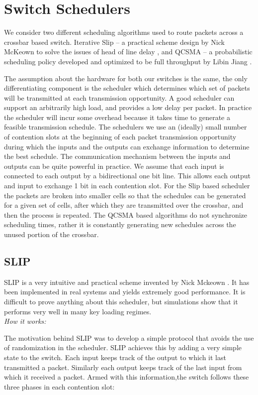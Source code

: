 \documentclass{IEEEtran}%
\begin{document}
\section{Switch Schedulers}
We consider two different scheduling algorithms used to route packets across a crossbar based switch.  Iterative Slip -- a practical scheme design by Nick McKeown to solve the issues of head of line delay \cite{McKeown}, and QCSMA -- a probabilistic scheduling policy developed and optimized to be full throughput by Libin Jiang \cite{Libin}.

The assumption about the hardware for both our switches is the same, the only differentiating component is the scheduler which determines which set of packets will be transmitted at each transmission opportunity.  A good scheduler can support an arbitrarily high load, and provides a low delay per packet.  In practice the scheduler will incur some overhead because it takes time to generate a feasible transmission schedule.  The schedulers we use an (ideally) small number of contention slots at the beginning of each packet transmission opportunity during which the inputs and the outputs can exchange information to determine the best schedule.  The communication mechanism between the inputs and outputs can be quite powerful in practice.  We assume that each input is connected to each output by a bidirectional one bit line. This allows each output and input to exchange 1 bit in each contention slot.  For the Slip based scheduler the packets are broken into smaller cells so that the schedules can be generated for a given set of cells, after which they are transmitted over the crossbar, and then the process is repeated.  The QCSMA based algorithms do not synchronize scheduling times, rather it is constantly generating new schedules across the unused portion of the crossbar.

\subsection{SLIP}

SLIP is a very intuitive and practical scheme invented by Nick Mckeown \cite{McKeown}.  It has been implemented in real systems and yields extremely good performance.  It is difficult to prove anything about this scheduler, but simulations show that it performs very well in many key loading regimes.\\

{\it How it works:}

The motivation behind SLIP was to develop a simple protocol that avoids the use of randomization in the scheduler.  SLIP achieves this by adding a very simple state to the switch.  Each input keeps track of the output to which it last transmitted a packet.  Similarly each output keeps track of the last input from which it received a packet.  Armed with this information,the switch follows these three phases in each contention slot:\\
\end{document}
